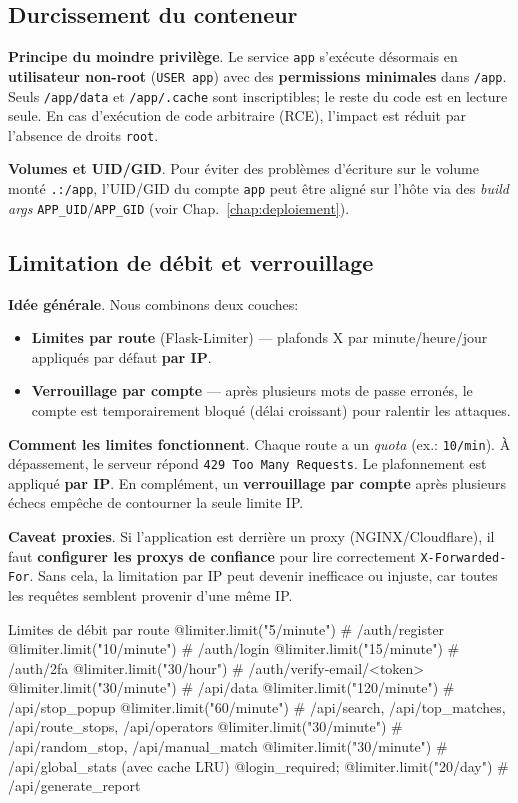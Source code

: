\subsection*{Durcissement du conteneur}
\noindent \textbf{Principe du moindre privilège}. Le service \texttt{app} s'exécute désormais en \textbf{utilisateur non-root} (\texttt{USER app}) avec des \textbf{permissions minimales} dans \texttt{/app}. Seuls \texttt{/app/data} et \texttt{/app/.cache} sont inscriptibles; le reste du code est en lecture seule. En cas d'exécution de code arbitraire (RCE), l'impact est réduit par l'absence de droits \texttt{root}.

\noindent \textbf{Volumes et UID/GID}. Pour éviter des problèmes d'écriture sur le volume monté \texttt{.:/app}, l'UID/GID du compte \texttt{app} peut être aligné sur l'hôte via des \textit{build args} \texttt{APP\_UID}/\texttt{APP\_GID} (voir Chap.~\ref{chap:deploiement}).

\subsection*{Limitation de débit et verrouillage}
\noindent \textbf{Idée générale}. Nous combinons deux couches:
\begin{itemize}
  \item \textbf{Limites par route} (Flask-Limiter) — plafonds \og X par minute/heure/jour \fg{} appliqués par défaut \textbf{par IP}.
  \item \textbf{Verrouillage par compte} — après plusieurs mots de passe erronés, le compte est temporairement bloqué (délai croissant) pour ralentir les attaques.
\end{itemize}

\noindent \textbf{Comment les limites fonctionnent}. Chaque route a un \emph{quota} (ex.: \texttt{10/min}). À dépassement, le serveur répond \texttt{429 Too Many Requests}. Le plafonnement est appliqué \textbf{par IP}. En complément, un \textbf{verrouillage par compte} après plusieurs échecs empêche de contourner la seule limite IP.

\noindent \textbf{Caveat proxies}. Si l'application est derrière un proxy (NGINX/Cloudflare), il faut \textbf{configurer les proxys de confiance} pour lire correctement \texttt{X-Forwarded-For}. Sans cela, la limitation \og par IP \fg{} peut devenir inefficace ou injuste, car toutes les requêtes semblent provenir d'une même IP.
\begin{codebox}[language=Python]{Limites de débit par route}
@limiter.limit("5/minute")   # /auth/register
@limiter.limit("10/minute")  # /auth/login
@limiter.limit("15/minute")  # /auth/2fa
@limiter.limit("30/hour")    # /auth/verify-email/<token>
@limiter.limit("30/minute")  # /api/data
@limiter.limit("120/minute") # /api/stop_popup
@limiter.limit("60/minute")  # /api/search, /api/top_matches, /api/route_stops, /api/operators
@limiter.limit("30/minute")  # /api/random_stop, /api/manual_match
@limiter.limit("30/minute")  # /api/global_stats (avec cache LRU)
@login_required; @limiter.limit("20/day")  # /api/generate_report
\end{codebox}


